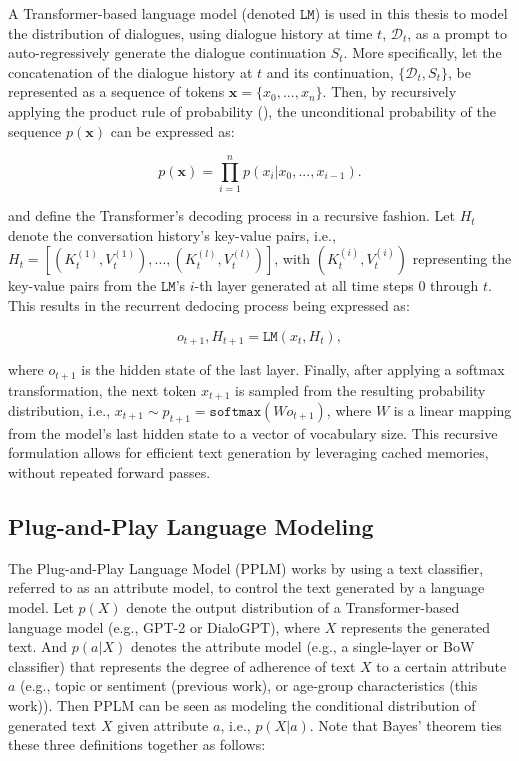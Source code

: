A Transformer-based language model (denoted $\texttt{LM}$) is used in this thesis to model the distribution of dialogues, using dialogue history at time $t$, $\mathcal{D}_t$, as a prompt to auto-regressively generate the dialogue continuation $S_t$. More specifically, let the concatenation of the dialogue history at $t$ and its continuation, $\{\mathcal{D}_t, S_t\}$, be represented as a sequence of tokens $\textbf{x}= \{x_0, ..., x_n\}$. Then, by recursively applying the product rule of probability (\cite{bishop2006pattern}), the unconditional probability of the sequence $p(\textbf{x})$ can be expressed as:

\begin{equation}
    p(\textbf{x}) = \prod_{i = 1}^n p(x_i | x_0, ..., x_{i - 1}).
\end{equation}

\cite{dathathri2019plug} and \cite{madotto-etal-2020-plug} define the Transformer's decoding process in a recursive fashion. Let $H_t$ denote the conversation history's key-value pairs, i.e., $H_t = \left[ (K_t^{(1)}, V_t^{(1)}), ..., (K_t^{(l)}, V_t^{(l)}) \right]$, with $(K_t^{(i)}, V_t^{(i)})$ representing the key-value pairs from the $\texttt{LM}$'s $i$-th layer generated at all time steps $0$ through $t$. This results in the recurrent dedocing process being expressed as:

\begin{equation}
    o_{t + 1}, H_{t + 1} = \texttt{LM} \left( x_t, H_t \right),
\label{eq:transformer_lm_io}
\end{equation}

where $o_{t + 1}$ is the hidden state of the last layer. Finally, after applying a softmax transformation, the next token $x_{t + 1}$ is sampled from the resulting probability distribution, i.e.,  $x_{t + 1} \sim p_{t + 1} = \texttt{softmax} \left( W o_{t + 1} \right)$, where $W$ is a linear mapping from the model's last hidden state to a vector of vocabulary size. This recursive formulation allows for efficient text generation by leveraging cached memories, without repeated forward passes.

\subsection{Plug-and-Play Language Modeling}
\label{sec:ppm}


The Plug-and-Play Language Model (PPLM) \cite{dathathri2019plug} works by using a text classifier, referred to as an attribute model, to control the text generated by a language model. Let $p(X)$ denote the output distribution of a Transformer-based language model (e.g., GPT-2 or DialoGPT), where $X$ represents the generated text. And $p(a | X)$ denotes the attribute model (e.g., a single-layer or BoW classifier) that represents the degree of adherence of text $X$ to a certain attribute $a$ (e.g., topic or sentiment (previous work), or age-group characteristics (this work)). Then PPLM can be seen as modeling the conditional distribution of generated text $X$ given attribute $a$, i.e., $p(X | a)$. Note that Bayes' theorem ties these three definitions together as follows:

